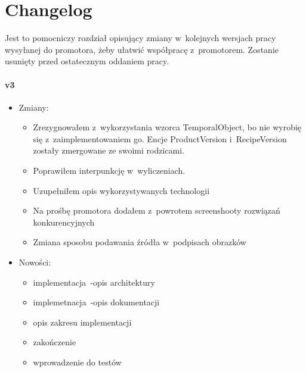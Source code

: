 \chapter*{Changelog}\label{ch:changelog}

Jest to pomocniczy rozdział opisujący zmiany w~kolejnych wersjach pracy wysyłanej do promotora, żeby ułatwić współpracę z~promotorem.
Zostanie usunięty przed ostatecznym oddaniem pracy.

\subsubsection{v3}
\begin{itemize}
\item Zmiany:
    \begin{itemize}
    	\item Zrezygnowałem z~wykorzystania wzorca TemporalObject, bo nie wyrobię się z~zaimplementowaniem go. Encje ProductVersion i~RecipeVersion zostały zmergowane ze swoimi rodzicami.
		\item Poprawiłem interpunkcję w~wyliczeniach.
		\item Uzupełniłem opis wykorzystywanych technologii
		\item Na prośbę promotora dodałem z~powrotem screenshooty rozwiązań konkurencyjnych
		\item Zmiana sposobu podawania źródła w~podpisach obrazków
	\end{itemize}
\item Nowości:
    \begin{itemize}
		\item implementacja~-opis architektury
		\item implemetnacja~-opis dokumentacji
		\item opis zakresu implementacji
		\item zakończenie
		\item wprowadzenie do testów
	\end{itemize}
\end{itemize}

